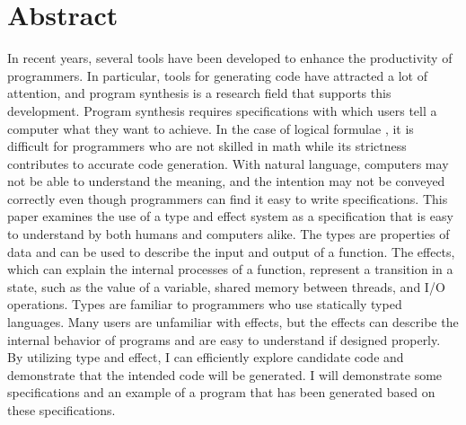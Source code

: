 \documentclass[12pt, a4paper, titlepage]{report}
\begin{document}
\chapter{Abstract} \label{section:abstract}
In recent years, several tools have been developed to enhance the productivity of programmers.
In particular, tools for generating code have attracted a lot of attention, and program synthesis is a research field that supports this development.
Program synthesis requires specifications with which users tell a computer what they want to achieve.
In the case of logical formulae  , it is
difficult for programmers who are not skilled in math while its strictness contributes to accurate code generation.  
With natural language, computers may not be able to understand the meaning, and the intention may not be conveyed correctly even though programmers can find it easy to write specifications.  
This paper examines the use of a type and effect system as a specification that is easy to understand by both humans and computers alike. The types are properties of data and can be used to describe the input and output of a function. The effects, which can explain the internal processes of a function, represent a transition in a state, such as the value of a variable, shared memory between threads, and I/O operations.
 
Types are familiar to programmers who use statically typed languages.
Many users are unfamiliar with effects, but the effects  can describe the internal behavior of programs  and are easy to understand if designed properly.
By utilizing type and effect, I can efficiently explore candidate code and demonstrate that the intended code will be generated. I will demonstrate some specifications and an example of a program that has been generated based on these specifications.
 
\end{document}
